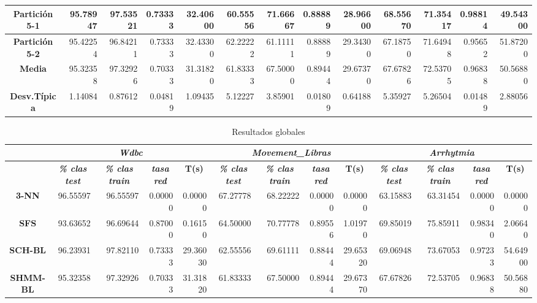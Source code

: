 \documentclass[a4paper,11pt]{article}
\begin{document}
\begin{table}[H]
\begin{adjustbox}{width=1.1\textwidth}
\begin{tabular}{|c|r|r|r|r|r|r|r|r|r|r|r|r|}
  \textbf{Partición 5-1} & 95.78947 & 97.53521 & 0.73333 & 32.40600 & 60.55556 & 71.66667 & 0.88889 & 28.96600 & 68.55670 & 71.35417 & 0.98814 & 49.54300 \\ \hline
  \textbf{Partición 5-2} & 95.42254 & 96.84211 & 0.73333 & 32.43300 & 62.22222 & 61.11111 & 0.88889 & 29.34300 & 67.18750 & 71.64948 & 0.95652 & 51.87200 \\ \hline
  \textbf{Media} & 95.32358 & 97.32926 & 0.70333 & 31.31820 & 61.83333 & 67.50000 & 0.89444 & 29.67370 & 67.67826 & 72.53705 & 0.96838 & 50.56880 \\ \hline
  \textbf{Desv.Típica} & 1.14084 & 0.87612 & 0.04819 & 1.09435 & 5.12227 & 3.85901 & 0.01809 & 0.64188 & 5.35927 & 5.26504 & 0.01489 & 2.88056 \\ \hline
  \end{tabular}
  \end{adjustbox}
  \label{SHMM}
  \end{table}
  
  
  
  \begin{table}[H]
  \caption{Resultados globales}
  \begin{adjustbox}{width=1.1\textwidth}
  \begin{tabular}{|c|r|r|r|r|r|r|r|r|r|r|r|r|}
  \hline
  \multicolumn{1}{|l|}{} & \multicolumn{ 4}{c|}{\textbf{\textit{Wdbc}}} & \multicolumn{ 4}{c|}{\textbf{\textit{Movement\_Libras}}} & \multicolumn{ 4}{c|}{\textbf{\textit{Arrhytmia}}} \\ \hline
  \multicolumn{1}{|l|}{} & \multicolumn{1}{c|}{\textbf{\textit{\% clas test}}} & \multicolumn{1}{c|}{\textbf{\textit{\% clas train}}} & \multicolumn{1}{c|}{\textbf{\textit{tasa red}}} & \multicolumn{1}{c|}{\textbf{T(s)}} & \multicolumn{1}{c|}{\textbf{\textit{\% clas test}}} & \multicolumn{1}{c|}{\textbf{\textit{\% clas train}}} & \multicolumn{1}{c|}{\textbf{\textit{tasa red}}} & \multicolumn{1}{c|}{\textbf{T(s)}} & \multicolumn{1}{c|}{\textbf{\textit{\% clas test}}} & \multicolumn{1}{c|}{\textbf{\textit{\% clas train}}} & \multicolumn{1}{c|}{\textbf{\textit{tasa red}}} & \multicolumn{1}{c|}{\textbf{T(s)}} \\ \hline
  \textbf{3-NN} & 96.55597 & 96.55597 & 0.00000 & 0.00000 & 67.27778 & 68.22222 & 0.00000 & 0.00000 & 63.15883 & 63.31454 & 0.00000 & 0.00000 \\ \hline
  \textbf{SFS} & 93.63652 & 96.69644 & 0.87000 & 0.16150 & 64.50000 & 70.77778 & 0.89556 & 1.01970 & 69.85019 & 75.85911 & 0.98340 & 2.06640 \\ \hline
  \textbf{SCH-BL} & 96.23931 & 97.82110 & 0.73333 & 29.36030 & 62.55556 & 69.61111 & 0.88444 & 29.65320 & 69.06948 & 73.67053 & 0.97233 & 54.64900 \\ \hline
  \textbf{SHMM-BL} & 95.32358 & 97.32926 & 0.70333 & 31.31820 & 61.83333 & 67.50000 & 0.89444 & 29.67370 & 67.67826 & 72.53705 & 0.96838 & 50.56880 \\ \hline
  \end{tabular}
  \end{adjustbox}
  \label{all}
  \end{table}
  
\end{document}
